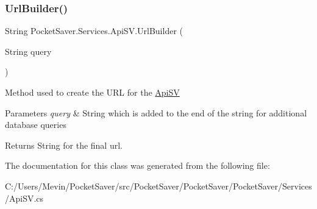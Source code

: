 \subsubsection{\texorpdfstring{Url\+Builder()}{UrlBuilder()}}
{\footnotesize\ttfamily String Pocket\+Saver.\+Services.\+Api\+S\+V.\+Url\+Builder (\begin{DoxyParamCaption}\item[{String}]{query }\end{DoxyParamCaption})\hspace{0.3cm}{\ttfamily [inline]}}



Method used to create the U\+RL for the \hyperlink{class_pocket_saver_1_1_services_1_1_api_s_v}{Api\+SV} 


\begin{DoxyParams}{Parameters}
{\em query} & String which is added to the end of the string for additional database queries\\
\hline
\end{DoxyParams}
\begin{DoxyReturn}{Returns}
String for the final url.
\end{DoxyReturn}


The documentation for this class was generated from the following file\+:\begin{DoxyCompactItemize}
\item 
C\+:/\+Users/\+Mevin/\+Pocket\+Saver/src/\+Pocket\+Saver/\+Pocket\+Saver/\+Pocket\+Saver/\+Services/Api\+S\+V.\+cs\end{DoxyCompactItemize}
